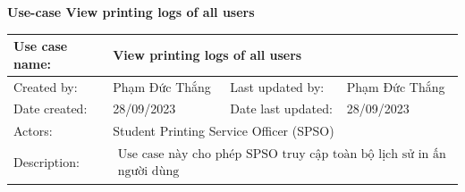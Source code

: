 \pagebreak
\textbf{Use-case View printing logs of all users}\par
\vspace{0.5cm}
\begin{tabular}{|l|l|l|l|}
\hline Use case name: & \multicolumn{3}{|l|}{View printing logs of all users} \\
\hline Created by: & Phạm Đức Thắng & Last updated by: &  Phạm Đức Thắng \\
\hline Date created: & 28/09/2023 & Date last updated: & 28/09/2023\\
\hline Actors: & \multicolumn{3}{|l|}{ Student Printing Service Officer (SPSO) } \\
\hline Description: & \multicolumn{3}{|l|}{$\begin{array}{l}\text{Use case này cho phép SPSO truy cập toàn bộ lịch sử in ấn của tất cả } \\ \text{người dùng} \end{array}$} \\


\end{tabular}
